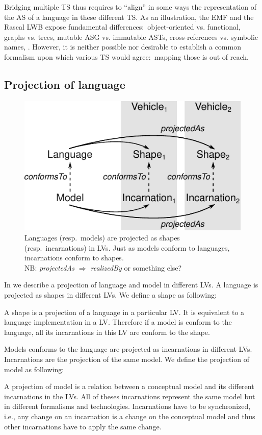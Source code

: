 Bridging multiple TS thus requires to ``align'' in some ways the representation of the AS of a language in these different TS.
As an illustration, the EMF and the Rascal LWB expose fundamental differences:~object-oriented vs. functional, graphs vs. trees, mutable ASG vs. immutable ASTs, cross-references vs. symbolic names, \etc.
However, it is neither possible nor desirable to establish a common formalism upon which various TS would agree:~mapping those is out of reach.

\subsection{Projection of language}

\begin{figure}
	\centering
	\includegraphics[width=.8\columnwidth]{figures/concepts}
	\caption{Languages (resp.~models) are projected as shapes (resp.~incarnations) in LVs. Just as models conform to languages, incarnations conform to shapes.\\NB: \emph{projectedAs $\Rightarrow$ realizedBy} or something else?}
	\label{fig:concepts}
\end{figure}

In  we describe a projection of language and model in different LVs.
A language is projected as shapes in different LVs.
We define a shape as following:
\begin{definition}
A shape is a projection of a language in a particular LV.
It is equivalent to a language implementation in a LV.
Therefore if a model is conform to the language, all its incarnations in this LV are conform to the shape.
\end{definition}
Models conforms to the language are projected as incarnations in different LVs.
Incarnations are the projection of the same model.
We define the projection of model as following:
\begin{definition}
A projection of model is a relation between a conceptual model and its different incarnations in the LVs.
All of theses incarnations represent the same model but in different formalisms and technologies.
Incarnations have to be synchronized, i.e., any change on an incarnation is a change on the conceptual model and thus other incarnations have to apply the same change.
\end{definition}


